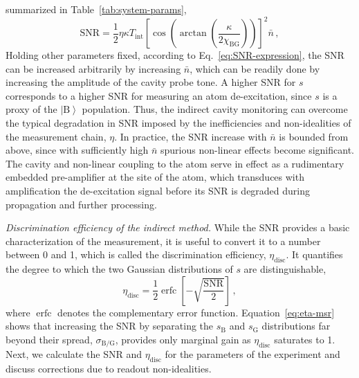 \documentclass[
						superscriptaddress, 																 amsmath, amssymb,
		 aps,  prb,  
										floatfix,
		linenumbers,
			]{revtex4-1}
\newcommand{\ket}[1]{\left|#1\right>}
\begin{document}
summarized in Table~\ref{tab:system-params},
\begin{equation}
\mathrm{SNR}=\frac{1}{2}\eta\kappa T_{\mathrm{int}}\left[\cos\left(\arctan\left(\frac{\kappa}{2\chi_{\mathrm{BG}}}\right)\right)\right]^{2}\bar{n}\,,\label{eq:SNR-expression}
\end{equation}
Holding other parameters fixed, according to Eq.~\eqref{eq:SNR-expression},
the SNR can be increased arbitrarily by increasing $\bar{n}$, which
can be readily done by increasing the amplitude of the cavity probe
tone. A higher SNR for $s$ corresponds to a higher SNR for measuring
an atom de-excitation, since $s$ is a proxy of the $\ket{\mathrm{B}}$
population. Thus, the indirect cavity monitoring can overcome the
typical degradation in SNR imposed by the inefficiencies and non-idealities
of the measurement chain, $\eta$. In practice, the SNR increase
with $\bar{n}$ is bounded from above, since with sufficiently high
$\bar{n}$ spurious non-linear effects become significant\cite{Boissonneault2008,Boissonneault2009-Photon-induced-relax,Minev2013,Sank2016-T1vsNbar,Khezri2016,Bultink2016,Khezri2017,Walter2017,Lescanne2018,Verney2018,Serniak2018}.
The cavity and non-linear coupling to the atom serve in effect as
a rudimentary embedded pre-amplifier at the site of the atom, which
transduces with amplification the de-excitation signal before its
SNR is degraded during propagation and further processing.

\emph{Discrimination efficiency of the indirect method.} While the
SNR provides a basic characterization of the measurement, it is useful
to convert it to a number between 0 and 1, which is called the discrimination
efficiency, $\eta_{\mathrm{disc}}$. It quantifies the degree to which
the two Gaussian distributions of $s$ are distinguishable,\cite{Gambetta2007-ProtocolsMsr}
\begin{equation}
\eta_{\mathrm{disc}}=\frac{1}{2}\operatorname{erfc}\left[-\sqrt{\frac{\mathrm{SNR}}{2}}\right]\,,\label{eq:eta-msr}
\end{equation}
where $\operatorname{erfc}$ denotes the complementary error function.
Equation~\eqref{eq:eta-msr} shows that increasing the SNR by separating
the $s_{\mathrm{B}}$ and $s_{\mathrm{G}}$ distributions far beyond
their spread, $\sigma_{\mathrm{B/G}}$, provides only marginal gain
as $\eta_{\mathrm{disc}}$ saturates to 1. Next, we calculate the
SNR and $\eta_{\mathrm{disc}}$ for the parameters of the experiment
and discuss corrections due to readout non-idealities. 
\end{document}
